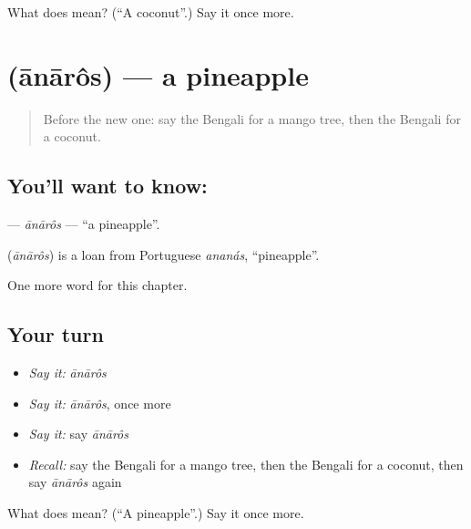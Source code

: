 \begin{tcolorbox}[breakable,colback=teal!4,colframe=teal!35!black,title={Before you move on}]
What does  mean? (\textquotedblleft{}A coconut\textquotedblright{}.) Say it once more.
\end{tcolorbox}
\section[\texorpdfstring{\bn{আনারস} (ānārôs)}{আনারস (ānārôs)}]{ (ānārôs) — a pineapple}

\label{lesson:BN-C115-anaros}



\begin{quote}
Before the new one: say the Bengali for a mango tree, then the Bengali for a coconut.
\end{quote}

\subsection*{You'll want to know: }
\textbf{} — \emph{ānārôs} — \textquotedblleft{}a pineapple\textquotedblright{}.

\begin{cousinweb}
\textbf{} (\emph{ānārôs}) is a loan from Portuguese \emph{ananás}, \textquotedblleft{}pineapple\textquotedblright{}.
\end{cousinweb}

\begin{grammarlens}[title={What you've built}]
One more word for this chapter.
\end{grammarlens}

\subsection*{Your turn}
\begin{itemize}
\raggedright
  \item \emph{Say it:} \emph{ānārôs}
  \item \emph{Say it:} \emph{ānārôs}, once more
  \item \emph{Say it:} say \emph{ānārôs}
  \item \emph{Recall:} say the Bengali for a mango tree, then the Bengali for a coconut, then say \emph{ānārôs} again
\end{itemize}

\begin{tcolorbox}[breakable,colback=teal!4,colframe=teal!35!black,title={Before you move on}]
What does  mean? (\textquotedblleft{}A pineapple\textquotedblright{}.) Say it once more.
\end{tcolorbox}
